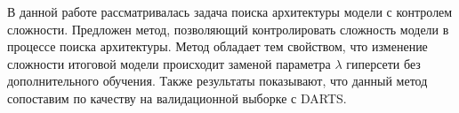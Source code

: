 \documentclass[12pt, twoside]{article}
\begin{document}
В данной работе рассматривалась задача поиска архитектуры модели с контролем сложности. Предложен метод, позволяющий контролировать сложность модели в процессе поиска архитектуры. Метод обладает тем свойством, что изменение сложности итоговой модели происходит заменой параметра $\lambda$ гиперсети без дополнительного обучения. Также результаты показывают, что данный метод сопоставим по качеству на валидационной выборке с DARTS.




\newpage

 \nocite{*}
\end{document}
